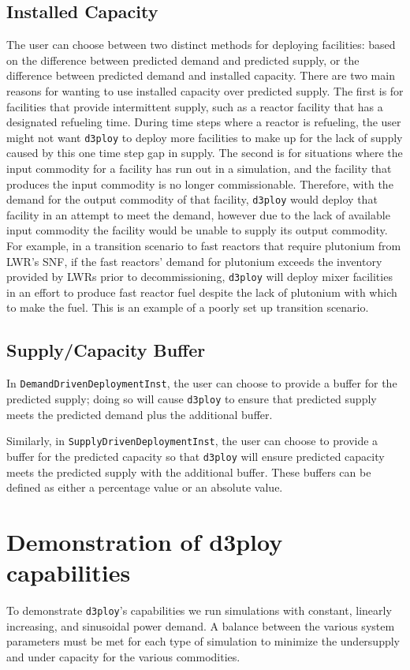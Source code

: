 \documentclass[11pt,letterpaper]{article}
\newcommand{\deploy}{\texttt{d3ploy}\xspace}%
\begin{document}
\subsection{\textbf{Installed Capacity}}
The user can choose between two distinct methods for deploying facilities: based on the difference 
between predicted demand and predicted supply, or the difference between predicted demand and 
installed capacity. 
There are two main reasons for wanting to use installed capacity over predicted 
supply. 
The first is for facilities that provide intermittent supply, such as a 
reactor facility that has a designated refueling time. 
During time steps where a reactor is refueling, the user might not 
want \deploy to deploy more facilities to make up for the lack of supply
caused by this one time step gap in supply. 
The second is for situations where the input commodity for a facility has
run out in a simulation, and the facility that produces the input commodity 
is no longer commissionable. 
Therefore, with the demand for the output commodity of that facility, \deploy
would deploy that facility in an attempt to meet the demand, however due to the lack of 
available input commodity the facility would be unable to supply its output commodity. 
For example, in a transition scenario to fast reactors that require plutonium 
from \gls{LWR}'s \gls{SNF}, if the fast reactors' demand for plutonium exceeds
the inventory provided by \gls{LWR}s prior to decommissioning, \deploy
will deploy mixer facilities in an effort to produce fast reactor 
fuel despite the lack of plutonium with which to make the fuel. 
This is an example of a poorly set up transition scenario. 

\subsection{\textbf{Supply/Capacity Buffer}}
In \texttt{DemandDrivenDeploymentInst}, the user can choose to provide a
buffer for the predicted supply; doing so will cause \deploy to ensure that predicted supply meets the predicted demand plus the 
additional buffer. 

Similarly, in \texttt{SupplyDrivenDeploymentInst}, the user can choose to 
provide a buffer for the predicted capacity so that \deploy will 
ensure predicted capacity meets the predicted supply with the 
additional buffer. 
These buffers can be defined as either a percentage value or an absolute value.  

\section{Demonstration of d3ploy capabilities}
To demonstrate \deploy's capabilities we run simulations with
constant, linearly increasing, and sinusoidal power demand.
A balance between the various system parameters must be 
met for each type of simulation to minimize the undersupply
and under capacity for the various commodities. 
\end{document}
